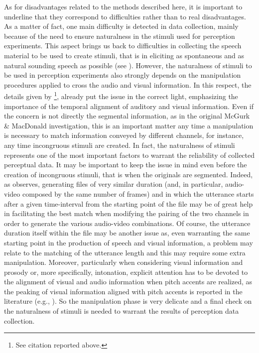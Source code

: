 \documentclass[output=paper]{langsci/langscibook}
\begin{document}
As for disadvantages related to the methods described here, it is important to underline that they correspond to difficulties rather than to real disadvantages. As a matter of fact, one main difficulty is detected in data collection, mainly because of the need to ensure naturalness in the stimuli used for perception experiments. This aspect brings us back to difficulties in collecting the speech material to be used to create stimuli, that is in eliciting as spontaneous and as natural sounding speech as possible (see ). However, the naturalness of stimuli to be used in perception experiments also strongly depends on the manipulation procedures applied to cross the audio and visual information. In this respect, the details given by \citet[746]{McGurk1976}\footnote{See citation reported above.}, already put the issue in the correct light, emphasizing the importance of the temporal alignment of auditory and visual information. Even if the concern is not directly the segmental information, as in the original McGurk \& MacDonald investigation, this is an important matter any time a manipulation is necessary to match information conveyed by different channels, for instance, any time incongruous stimuli are created. In fact, the naturalness of stimuli represents one of the most important factors to warrant the reliability of collected perceptual data. It may be important to keep the issue in mind even before the creation of incongruous stimuli, that is when the originals are segmented. Indeed, as  \citet[211]{GiliFivela2015informazionimultimodali} observes, generating files of very similar duration (and, in particular, audio-video composed by the same number of frames) and in which the utterance starts after a given time-interval from the starting point of the file may be of great help in facilitating the best match when modifying the pairing of the two channels in order to generate the various audio-video combinations. Of course, the utterance duration itself within the file may be another issue as, even warranting the same starting point in the production of speech and visual information, a problem may relate to the matching of the utterance length and this may require some extra manipulation. Moreover, particularly when considering visual information and prosody or, more specifically, intonation, explicit attention has to be devoted to the alignment of visual and audio information when pitch accents are realized, as the peaking of visual information aligned with pitch accents is reported in the literature (e.g., \citealt{Cassell1994,Loehr2004,Swerts2008}). So the manipulation phase is very delicate and a final check on the naturalness of stimuli is needed to warrant the results of perception data collection.
\end{document}
